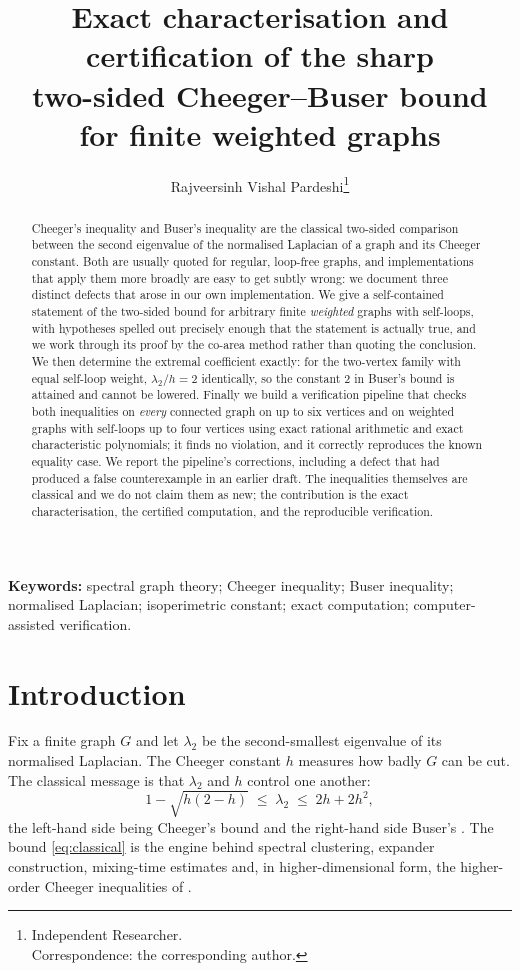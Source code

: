 \documentclass[11pt,a4paper]{article}
\title{\bfseries Exact characterisation and certification of the sharp\\
two-sided Cheeger--Buser bound for finite weighted graphs}
\author{Rajveersinh Vishal Pardeshi\thanks{Independent Researcher. \\
Correspondence: the corresponding author.}}
\date{}
\theoremstyle{plain}
\theoremstyle{definition}
\begin{document}
\maketitle

\begin{abstract}
Cheeger's inequality and Buser's inequality are the classical two-sided
comparison between the second eigenvalue of the normalised Laplacian of a
graph and its Cheeger constant.  Both are usually quoted for regular,
loop-free graphs, and implementations that apply them more broadly are easy to
get subtly wrong: we document three distinct defects that arose in our own
implementation.  We give a self-contained statement of the two-sided bound for
arbitrary finite \emph{weighted} graphs with self-loops, with hypotheses
spelled out precisely enough that the statement is actually true, and we work
through its proof by the co-area method rather than quoting the conclusion.  We
then determine the extremal
coefficient exactly: for the two-vertex family with equal self-loop weight,
$\lambda_2/h = 2$ identically, so the constant $2$ in Buser's bound is
attained and cannot be lowered.  Finally we build a verification pipeline that
checks both inequalities on \emph{every} connected graph on up to six vertices
and on weighted graphs with self-loops up to four vertices using exact rational
arithmetic and exact characteristic polynomials; it finds no violation, and it
correctly reproduces the known equality case.  We report the pipeline's
corrections, including a defect that had produced a false counterexample in an
earlier draft.  The inequalities themselves are classical and we do not claim
them as new; the contribution is the exact characterisation, the certified
computation, and the reproducible verification.
\end{abstract}

\noindent\textbf{Keywords:} spectral graph theory; Cheeger inequality; Buser
inequality; normalised Laplacian; isoperimetric constant; exact computation;
computer-assisted verification.

\section{Introduction}\label{sec:intro}

Fix a finite graph $G$ and let $\lambda_2$ be the second-smallest eigenvalue of
its normalised Laplacian.  The Cheeger constant $h$ measures how badly $G$ can
be cut.  The classical message is that $\lambda_2$ and $h$ control one another:
\begin{equation}\label{eq:classical}
  1-\sqrt{h(2-h)} \;\le\; \lambda_2 \;\le\; 2h+2h^{2},
\end{equation}
the left-hand side being Cheeger's bound and the right-hand side Buser's
\cite{chung1997,alon1985,dodziuk1984,mohar1988,mohar1989}.  The bound
\eqref{eq:classical} is the engine behind spectral clustering, expander
construction, mixing-time estimates and, in higher-dimensional form, the
higher-order Cheeger inequalities of \cite{lee2014}.
\end{document}
